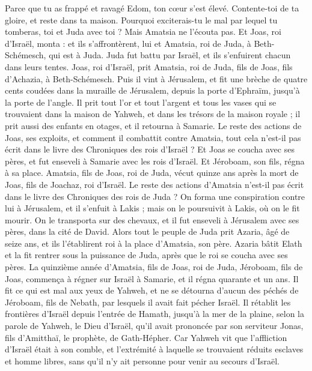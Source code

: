 \begin{multicols}{2}
Parce que tu as frappé et ravagé Edom, ton cœur s’est élevé. Contente-toi de ta gloire, et reste dans ta maison. Pourquoi exciterais-tu le mal par lequel tu tomberas, toi et Juda avec toi ?
Mais Amatsia ne l’écouta pas. Et Joas, roi d’Israël, monta : et ils s’affrontèrent, lui et Amatsia, roi de Juda, à Beth-Schémesch, qui est à Juda.
Juda fut battu par Israël, et ils s’enfuirent chacun dans leurs tentes.
Joas, roi d’Israël, prit Amatsia, roi de Juda, fils de Joas, fils d’Achazia, à Beth-Schémesch. Puis il vint à Jérusalem, et fit une brèche de quatre cents coudées dans la muraille de Jérusalem, depuis la porte d’Ephraïm, jusqu’à la porte de l’angle.
Il prit tout l’or et tout l’argent et tous les vases qui se trouvaient dans la maison de Yahweh, et dans les trésors de la maison royale ; il prit aussi des enfants en otages, et il retourna à Samarie.
Le reste des actions de Joas, ses exploits, et comment il combattit contre Amatsia, tout cela n’est-il pas écrit dans le livre des Chroniques des rois d’Israël ?
Et Joas se coucha avec ses pères, et fut enseveli à Samarie avec les rois d’Israël. Et Jéroboam, son fils, régna à sa place.
Amatsia, fils de Joas, roi de Juda, vécut quinze ans après la mort de Joas, fils de Joachaz, roi d’Israël.
Le reste des actions d’Amatsia n’est-il pas écrit dans le livre des Chroniques des rois de Juda ?
On forma une conspiration contre lui à Jérusalem, et il s’enfuit à Lakis ; mais on le poursuivit à Lakis, où on le fit mourir.
On le transporta sur des chevaux, et il fut enseveli à Jérusalem avec ses pères, dans la cité de David.
Alors tout le peuple de Juda prit Azaria, âgé de seize ans, et ils l’établirent roi à la place d’Amatsia, son père.
Azaria bâtit Elath et la fit rentrer sous la puissance de Juda, après que le roi se coucha avec ses pères.
La quinzième année d’Amatsia, fils de Joas, roi de Juda, Jéroboam, fils de Joas, commença à régner sur Israël à Samarie, et il régna quarante et un ans.
Il fit ce qui est mal aux yeux de Yahweh, et ne se détourna d’aucun des péchés de Jéroboam, fils de Nebath, par lesquels il avait fait pécher Israël.
Il rétablit les frontières d’Israël depuis l’entrée de Hamath, jusqu’à la mer de la plaine, selon la parole de Yahweh, le Dieu d’Israël, qu’il avait prononcée par son serviteur Jonas\FTNT{}, fils d’Amitthaï, le prophète, de Gath-Hépher.
Car Yahweh vit que l’affliction d’Israël était à son comble, et l’extrémité à laquelle se trouvaient réduits esclaves et homme libres, sans qu’il n’y ait personne pour venir au secours d’Israël.

\end{multicols}
